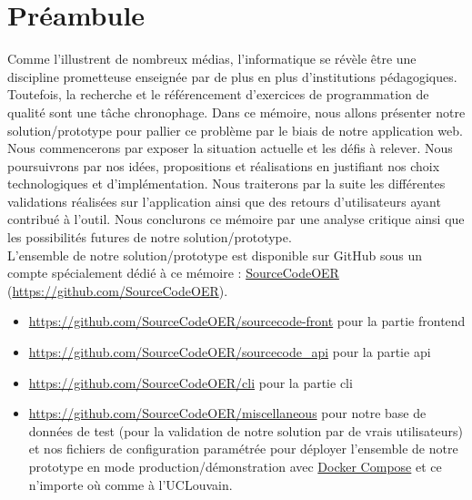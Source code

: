 \chapter*{Préambule}


Comme l'illustrent de nombreux médias, l'informatique se révèle être une discipline prometteuse enseignée par de plus en plus d'institutions pédagogiques. Toutefois, la recherche et le référencement d'exercices de programmation de qualité sont une tâche chronophage.
Dans ce mémoire, nous allons présenter notre solution/prototype pour pallier ce problème par le biais de notre application web. Nous commencerons par exposer la situation actuelle et les défis à relever. Nous poursuivrons par nos idées, propositions et réalisations en justifiant nos choix technologiques et d'implémentation. Nous traiterons par la suite les différentes validations réalisées sur l'application ainsi que des retours d'utilisateurs ayant contribué à l'outil. Nous conclurons ce mémoire par une analyse critique ainsi que les possibilités futures de notre solution/prototype. \\

L'ensemble de notre solution/prototype est disponible sur GitHub sous un compte spécialement dédié à ce mémoire : 
\href{https://github.com/SourceCodeOER}{SourceCodeOER} (\href{https://github.com/SourceCodeOER}{https://github.com/SourceCodeOER}).

\begin{itemize}
    \item \href{https://github.com/SourceCodeOER/sourcecode-front}{https://github.com/SourceCodeOER/sourcecode-front} pour la partie \Gls{frontend}
    \item \href{https://github.com/SourceCodeOER/sourcecode\_api}{https://github.com/SourceCodeOER/sourcecode\_api} pour la partie \Gls{api}
    \item \href{https://github.com/SourceCodeOER/cli}{https://github.com/SourceCodeOER/cli} pour la partie \Gls{cli}
    \item \href{https://github.com/SourceCodeOER/miscellaneous}{https://github.com/SourceCodeOER/miscellaneous} pour notre base de données de test (pour la validation de notre solution par de vrais utilisateurs) et nos fichiers de configuration paramétrée pour déployer l'ensemble de notre prototype en mode production/démonstration avec \href{https://docs.docker.com/compose/}{Docker Compose} et ce n'importe où comme à l'UCLouvain.
\end{itemize}

